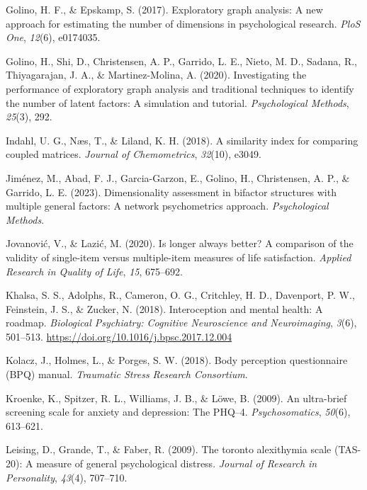 \documentclass[
  jou,
  floatsintext,
  longtable,
  nolmodern,
  notxfonts,
  notimes,
  colorlinks=true,linkcolor=blue,citecolor=blue,urlcolor=blue]{apa7}
\newlength{\cslhangindent}
\newenvironment{CSLReferences}[2] %
 {\begin{list}{}{%
  \setlength{\itemindent}{0pt}
  \setlength{\leftmargin}{0pt}
  \setlength{\parsep}{0pt}
  \ifodd #1
   \setlength{\leftmargin}{\cslhangindent}
   \setlength{\itemindent}{-1\cslhangindent}
  \fi
  \setlength{\itemsep}{#2\baselineskip}}}
 {\end{list}}
\begin{document}
\begin{CSLReferences}{1}{0}
Golino, H. F., \& Epskamp, S. (2017). Exploratory graph analysis: A new
approach for estimating the number of dimensions in psychological
research. \emph{PloS One}, \emph{12}(6), e0174035.

Golino, H., Shi, D., Christensen, A. P., Garrido, L. E., Nieto, M. D.,
Sadana, R., Thiyagarajan, J. A., \& Martinez-Molina, A. (2020).
Investigating the performance of exploratory graph analysis and
traditional techniques to identify the number of latent factors: A
simulation and tutorial. \emph{Psychological Methods}, \emph{25}(3),
292.

Indahl, U. G., Næs, T., \& Liland, K. H. (2018). A similarity index for
comparing coupled matrices. \emph{Journal of Chemometrics},
\emph{32}(10), e3049.

Jiménez, M., Abad, F. J., Garcia-Garzon, E., Golino, H., Christensen, A.
P., \& Garrido, L. E. (2023). Dimensionality assessment in bifactor
structures with multiple general factors: A network psychometrics
approach. \emph{Psychological Methods}.

Jovanović, V., \& Lazić, M. (2020). Is longer always better? A
comparison of the validity of single-item versus multiple-item measures
of life satisfaction. \emph{Applied Research in Quality of Life},
\emph{15}, 675--692.

Khalsa, S. S., Adolphs, R., Cameron, O. G., Critchley, H. D., Davenport,
P. W., Feinstein, J. S., \& Zucker, N. (2018). Interoception and mental
health: A roadmap. \emph{Biological Psychiatry: Cognitive Neuroscience
and Neuroimaging}, \emph{3}(6), 501--513.
\url{https://doi.org/10.1016/j.bpsc.2017.12.004}

Kolacz, J., Holmes, L., \& Porges, S. W. (2018). Body perception
questionnaire (BPQ) manual. \emph{Traumatic Stress Research Consortium}.

Kroenke, K., Spitzer, R. L., Williams, J. B., \& Löwe, B. (2009). An
ultra-brief screening scale for anxiety and depression: The PHQ--4.
\emph{Psychosomatics}, \emph{50}(6), 613--621.

Leising, D., Grande, T., \& Faber, R. (2009). The toronto alexithymia
scale (TAS-20): A measure of general psychological distress.
\emph{Journal of Research in Personality}, \emph{43}(4), 707--710.


\end{CSLReferences}
\end{document}
